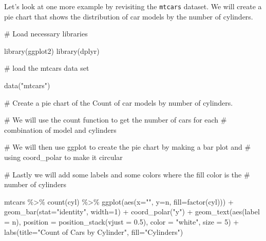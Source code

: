 \documentclass[
  letterpaper,
  DIV=11,
  numbers=noendperiod]{scrreprt}
\newenvironment{Shaded}{\begin{snugshade}}{\end{snugshade}}
\newcommand{\AttributeTok}[1]{\textcolor[rgb]{0.40,0.45,0.13}{#1}}
\newcommand{\CommentTok}[1]{\textcolor[rgb]{0.37,0.37,0.37}{#1}}
\newcommand{\DecValTok}[1]{\textcolor[rgb]{0.68,0.00,0.00}{#1}}
\newcommand{\FloatTok}[1]{\textcolor[rgb]{0.68,0.00,0.00}{#1}}
\newcommand{\FunctionTok}[1]{\textcolor[rgb]{0.28,0.35,0.67}{#1}}
\newcommand{\NormalTok}[1]{\textcolor[rgb]{0.00,0.23,0.31}{#1}}
\newcommand{\SpecialCharTok}[1]{\textcolor[rgb]{0.37,0.37,0.37}{#1}}
\newcommand{\StringTok}[1]{\textcolor[rgb]{0.13,0.47,0.30}{#1}}
\begin{document}
Let's look at one more example by revisiting the \texttt{mtcars}
dataset. We will create a pie chart that shows the distribution of car
models by the number of cylinders.

\begin{Shaded}
\begin{Highlighting}[]
\CommentTok{\# Load necessary libraries}

\FunctionTok{library}\NormalTok{(ggplot2)}
\FunctionTok{library}\NormalTok{(dplyr)}

\CommentTok{\# load the mtcars data set}

\FunctionTok{data}\NormalTok{(}\StringTok{"mtcars"}\NormalTok{)}

\CommentTok{\# Create a pie chart of the Count of car models by number of cylinders. }

\CommentTok{\# We will use the count function to get the number of cars for each }
\CommentTok{\# combination of model and cylinders}

\CommentTok{\# We will then use ggplot to create the pie chart by making a bar plot and}
\CommentTok{\# using coord\_polar to make it circular}

\CommentTok{\# Lastly we will add some labels and some colors where the fill color is the }
\CommentTok{\# number of cylinders}

\NormalTok{mtcars }\SpecialCharTok{\%\textgreater{}\%}
  \FunctionTok{count}\NormalTok{(cyl) }\SpecialCharTok{\%\textgreater{}\%}
  \FunctionTok{ggplot}\NormalTok{(}\FunctionTok{aes}\NormalTok{(}\AttributeTok{x=}\StringTok{""}\NormalTok{, }\AttributeTok{y=}\NormalTok{n, }\AttributeTok{fill=}\FunctionTok{factor}\NormalTok{(cyl))) }\SpecialCharTok{+}
  \FunctionTok{geom\_bar}\NormalTok{(}\AttributeTok{stat=}\StringTok{"identity"}\NormalTok{, }\AttributeTok{width=}\DecValTok{1}\NormalTok{) }\SpecialCharTok{+}
  \FunctionTok{coord\_polar}\NormalTok{(}\StringTok{"y"}\NormalTok{) }\SpecialCharTok{+}
  \FunctionTok{geom\_text}\NormalTok{(}\FunctionTok{aes}\NormalTok{(}\AttributeTok{label =}\NormalTok{ n),}
        \AttributeTok{position =} \FunctionTok{position\_stack}\NormalTok{(}\AttributeTok{vjust =} \FloatTok{0.5}\NormalTok{),}
        \AttributeTok{color =} \StringTok{"white"}\NormalTok{, }\AttributeTok{size =} \DecValTok{5}\NormalTok{) }\SpecialCharTok{+}
  \FunctionTok{labs}\NormalTok{(}\AttributeTok{title=}\StringTok{"Count of Cars by Cylinder"}\NormalTok{,}
       \AttributeTok{fill=}\StringTok{"Cylinders"}\NormalTok{)}
\end{Highlighting}
\end{Shaded}
\end{document}
